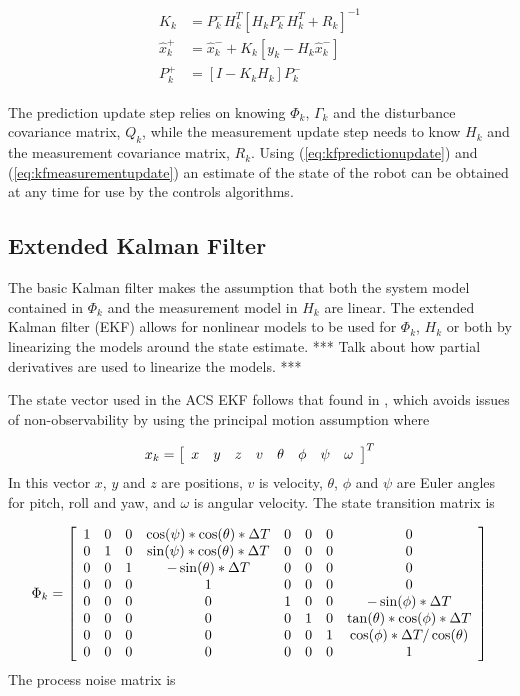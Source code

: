 \begin{align}
\label{eq:kfmeasurementupdate}
\begin{split}
K_k &= P_k^-H_k^T\left[H_kP_k^-H_k^T + R_k\right]^{-1} \\
\hat{x}_k^+ &= \hat{x}_k^- + K_k\left[y_k - H_k\hat{x}_k^-\right] \\
P_k^+ &= \left[I - K_kH_k\right]P_k^-
\end{split}
\end{align}

The prediction update step relies on knowing $\Phi_k$, $\Gamma_k$ and the disturbance covariance matrix, $Q_k$, while the measurement update step needs to know $H_k$ and the measurement covariance matrix, $R_k$. Using (\ref{eq:kfpredictionupdate}) and (\ref{eq:kfmeasurementupdate}) an estimate of the state of the robot can be obtained at any time for use by the controls algorithms.

\subsection{Extended Kalman Filter}
\label{sec:extendedkf}
The basic Kalman filter makes the assumption that both the system model contained in $\Phi_k$ and the measurement model in $H_k$ are linear. The extended Kalman filter (EKF) allows for nonlinear models to be used for $\Phi_k$, $H_k$ or both by linearizing the models around the state estimate. *** Talk about how partial derivatives are used to linearize the models. ***

The state vector used in the ACS EKF follows that found in \cite{Kelly_1994_338}, \cite{Kelly_1994_333} which avoids issues of non-observability by using the principal motion assumption where

\begin{align*}
x_k = \left[\begin{array}{c c c c c c c c} x & y & z & v & \theta & \phi & \psi & \omega \end{array}\right]^T
\end{align*}
In this vector $x$, $y$ and $z$ are positions, $v$ is velocity, $\theta$, $\phi$ and $\psi$ are Euler angles for pitch, roll and yaw, and $\omega$ is angular velocity. The state transition matrix is

\begin{align*}
\Phi_k = \left[\begin{array}{c c c c c c c c}
1 & 0 & 0 & \cos(\psi)*\cos(\theta)*\Delta T & 0 & 0 & 0 & 0 \\
0 & 1 & 0 & \sin(\psi)*\cos(\theta)*\Delta T & 0 & 0 & 0 & 0\\
0 & 0 & 1 & -\sin(\theta)*\Delta T & 0 & 0 & 0 & 0\\
0 & 0 & 0 & 1 & 0 & 0 & 0 & 0 \\
0 & 0 & 0 & 0 & 1 & 0 & 0 & -\sin(\phi)*\Delta T \\
0 & 0 & 0 & 0 & 0 & 1 & 0 & \tan(\theta)*\cos(\phi)*\Delta T \\
0 & 0 & 0 & 0 & 0 & 0 & 1 & \cos(\phi)*\Delta T/\cos(\theta)\\
0 & 0 & 0 & 0 & 0 & 0 & 0 & 1
\end{array}\right]
\end{align*}
The process noise matrix is


